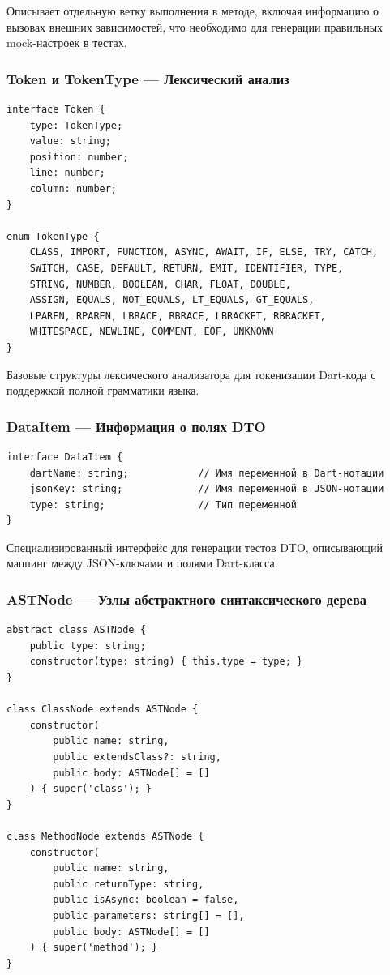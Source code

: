\documentclass[14pt, russian]{scrartcl}
\begin{document}
Описывает отдельную ветку выполнения в методе, включая информацию о вызовах внешних зависимостей, что необходимо для генерации правильных mock-настроек в тестах.

\subsubsection{Token и TokenType — Лексический анализ}

\begin{verbatim}
interface Token {
    type: TokenType;
    value: string;
    position: number;
    line: number;
    column: number;
}

enum TokenType {
    CLASS, IMPORT, FUNCTION, ASYNC, AWAIT, IF, ELSE, TRY, CATCH,
    SWITCH, CASE, DEFAULT, RETURN, EMIT, IDENTIFIER, TYPE,
    STRING, NUMBER, BOOLEAN, CHAR, FLOAT, DOUBLE,
    ASSIGN, EQUALS, NOT_EQUALS, LT_EQUALS, GT_EQUALS,
    LPAREN, RPAREN, LBRACE, RBRACE, LBRACKET, RBRACKET,
    WHITESPACE, NEWLINE, COMMENT, EOF, UNKNOWN
}
\end{verbatim}

Базовые структуры лексического анализатора для токенизации Dart-кода с поддержкой полной грамматики языка.

\subsubsection{DataItem — Информация о полях DTO}

\begin{verbatim}
interface DataItem {
    dartName: string;            // Имя переменной в Dart-нотации
    jsonKey: string;             // Имя переменной в JSON-нотации
    type: string;                // Тип переменной
}
\end{verbatim}

Специализированный интерфейс для генерации тестов DTO, описывающий маппинг между JSON-ключами и полями Dart-класса.

\subsubsection{ASTNode — Узлы абстрактного синтаксического дерева}

\begin{verbatim}
abstract class ASTNode {
    public type: string;
    constructor(type: string) { this.type = type; }
}

class ClassNode extends ASTNode {
    constructor(
        public name: string,
        public extendsClass?: string,
        public body: ASTNode[] = []
    ) { super('class'); }
}

class MethodNode extends ASTNode {
    constructor(
        public name: string,
        public returnType: string,
        public isAsync: boolean = false,
        public parameters: string[] = [],
        public body: ASTNode[] = []
    ) { super('method'); }
}
\end{verbatim}
\end{document}
